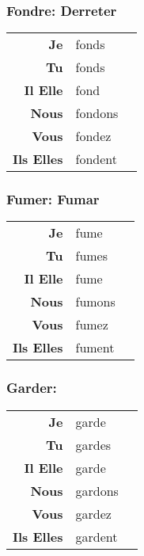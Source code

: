 \documentclass{subfiles}
\begin{document}
\begin{multicols*}{3}
        \subsubsection{Fondre: Derreter}
            \begin{tabular}{r l r}
                \textbf{Je}        & fonds   &\\
                \textbf{Tu}        & fonds   &\\
                \textbf{Il Elle}   & fond    &\\
                \textbf{Nous}      & fondons &\\
                \textbf{Vous}      & fondez  &\\
                \textbf{Ils Elles} & fondent &
            \end{tabular}

        \subsubsection{Fumer: Fumar}
            \begin{tabular}{r l r}
                \textbf{Je}        & fume   &\\
                \textbf{Tu}        & fumes  &\\
                \textbf{Il Elle}   & fume   &\\
                \textbf{Nous}      & fumons &\\
                \textbf{Vous}      & fumez  &\\
                \textbf{Ils Elles} & fument &
            \end{tabular}

        \subsubsection{Garder: }
            \begin{tabular}{r l r}
                \textbf{Je}        & garde   &\\
                \textbf{Tu}        & gardes  &\\
                \textbf{Il Elle}   & garde   &\\
                \textbf{Nous}      & gardons &\\
                \textbf{Vous}      & gardez  &\\
                \textbf{Ils Elles} & gardent &
            \end{tabular}


\end{multicols*}
\end{document}
